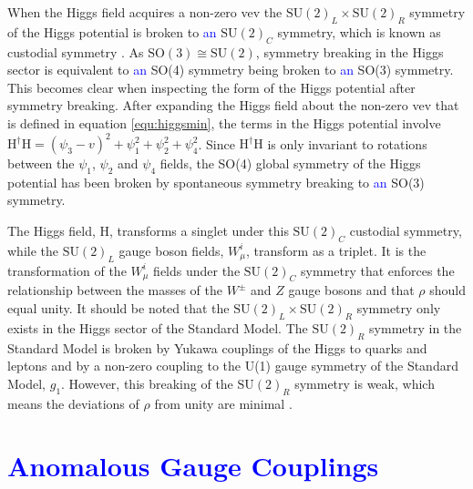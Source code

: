 When the Higgs field acquires a non-zero vev the $\text{SU}(2)_{L} \times \text{SU}(2)_{R}$ symmetry of the Higgs potential is broken to \textcolor{blue}{an} $\text{SU}(2)_{C}$ symmetry, which is known as custodial symmetry \cite{Grojean:2007zz}.  As $\text{SO}(3) \cong \text{SU}(2)$, symmetry breaking in the Higgs sector is equivalent to \textcolor{blue}{an} SO(4) symmetry being broken to \textcolor{blue}{an} SO(3) symmetry.  This becomes clear when inspecting the form of the Higgs potential after symmetry breaking.  After expanding the Higgs field about the non-zero vev that is defined in equation \ref{equ:higgsmin}, the terms in the Higgs potential involve $\text{H}^{\dagger}\text{H} = (\psi_{3}-v)^{2} + \psi_{1}^{2} + \psi_{2}^{2} + \psi_{4}^{2}$.  Since $\text{H}^{\dagger}\text{H} $ is only invariant to rotations between the $\psi_{1}$, $\psi_{2}$ and $\psi_{4}$ fields, the SO(4) global symmetry of the Higgs potential has been broken by spontaneous symmetry breaking to \textcolor{blue}{an} SO(3) symmetry.

The Higgs field, H, transforms a singlet under this $\text{SU}(2)_{C}$ custodial symmetry, while the $\text{SU}(2)_{L}$ gauge boson fields, $W^{i}_{\mu}$, transform as a triplet.  It is the transformation of the $W^{i}_{\mu}$ fields under the $\text{SU}(2)_{C}$ symmetry that enforces the relationship between the masses of the $W^{\pm}$ and $Z$ gauge bosons and that $\rho$ should equal unity.  It should be noted that the $\text{SU}(2)_{L} \times \text{SU}(2)_{R}$ symmetry only exists in the Higgs sector of the Standard Model.  The $\text{SU}(2)_{R}$ symmetry in the Standard Model is broken by Yukawa couplings of the Higgs to quarks and leptons and by a non-zero coupling to the U(1) gauge symmetry of the Standard Model, $g_{1}$.  However, this breaking of the $\text{SU}(2)_{R}$ symmetry is weak, which means the deviations of $\rho$ from unity are minimal \cite{Grojean:2007zz}.  

\section{\textcolor{blue}{Anomalous Gauge Couplings}}

